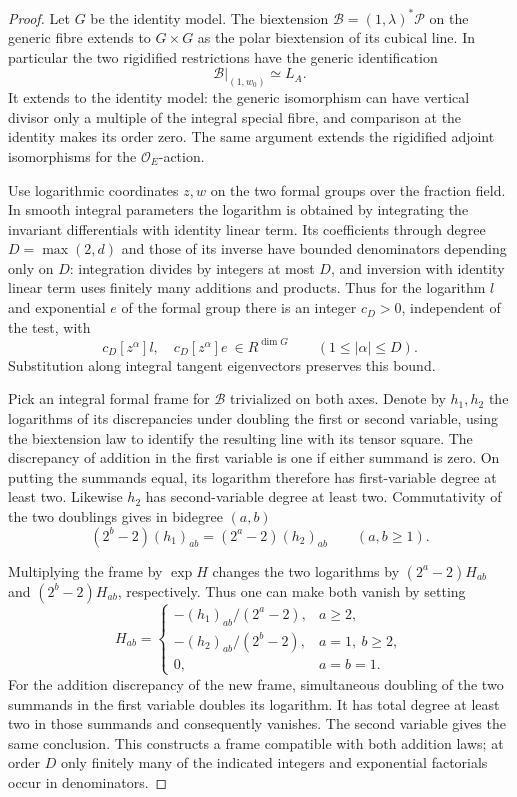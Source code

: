 \begin{proof}
Let \(G\) be the identity model. The biextension
\(\mathcal B=(1,\lambda)^*\mathcal P\) on the generic fibre extends
to \(G\times G\) as the polar biextension of its cubical line.
In particular the two rigidified restrictions have the generic identification
\[
            \mathcal B|_{(1,w_0)}\simeq L_A .
\]
It extends to the identity model: the
generic isomorphism can have vertical divisor only a multiple
of the integral special fibre, and comparison at the identity
makes its order zero. The same argument extends the rigidified
adjoint isomorphisms for the \(\mathcal O_E\)-action.

Use logarithmic coordinates \(z,w\) on the two formal groups over
the fraction field. In smooth integral parameters the logarithm
is obtained by integrating the invariant differentials with identity
linear term. Its coefficients through degree \(D=\max(2,d)\) and
those of its inverse have bounded denominators depending only on
\(D\): integration divides by integers at most \(D\), and inversion
with identity linear term uses finitely many additions and products.
Thus for the logarithm \(l\) and exponential \(e\) of the formal group there is an integer \(c_D>0\), independent of the test, with
\[
    c_D [z^\alpha]l,\quad c_D[z^\alpha]e\ \in R^{\dim G}
                   \qquad(1\le|\alpha|\le D).
\]
Substitution along integral tangent eigenvectors preserves this bound.

Pick an integral formal frame for \(\mathcal B\) trivialized on
both axes. Denote by \(h_1,h_2\) the logarithms of its discrepancies
under doubling the first or second variable, using the biextension
law to identify the resulting line with its tensor square.
The discrepancy of addition in the first variable is one if either
summand is zero. On putting the summands equal, its logarithm
therefore has first-variable degree at least two. Likewise \(h_2\)
has second-variable degree at least two. Commutativity of the two
doublings gives in bidegree \((a,b)\)
\[
 (2^b-2)(h_1)_{ab}=(2^a-2)(h_2)_{ab}\qquad(a,b\ge1).
\]

Multiplying the frame by \(\exp H\) changes the two logarithms by
\((2^a-2)H_{ab}\) and \((2^b-2)H_{ab}\), respectively. Thus one
can make both vanish by setting
\[
 H_{ab}=\begin{cases}
 -(h_1)_{ab}/(2^a-2),&a\ge2,\\
 -(h_2)_{ab}/(2^b-2),&a=1,\ b\ge2,\\
 0,&a=b=1.
 \end{cases}
\]
For the addition discrepancy of the new frame, simultaneous
doubling of the two summands in the first variable doubles its
logarithm. It has total degree at least two in those summands
and consequently vanishes. The second variable gives the same
conclusion. This constructs a frame compatible with both addition
laws; at order \(D\) only finitely many of the indicated integers
and exponential factorials occur in denominators.


\end{proof}
